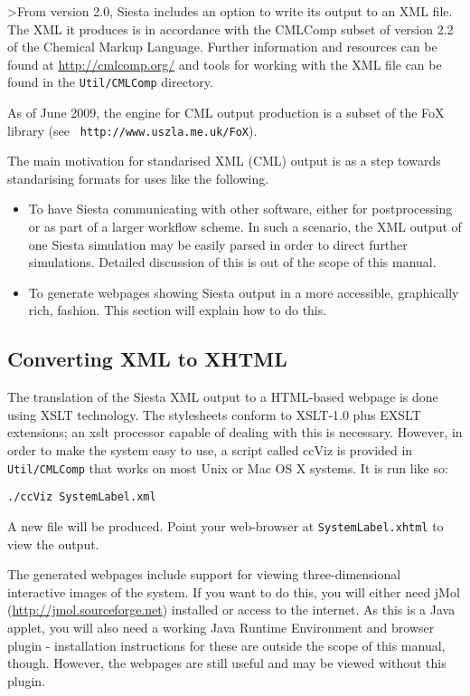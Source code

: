 \documentclass[11pt]{article}
\begin{document}
>From version 2.0, {\sc Siesta} includes an option to write its output to an
XML file. The XML it produces is in accordance with the CMLComp subset of
version 2.2 of the Chemical Markup Language. Further information
and resources can be found at \url{http://cmlcomp.org/} and tools for working
with the XML file can be found in the \texttt{Util/CMLComp} directory.

As of June 2009, the engine for CML output production is a subset of
the FoX library (see {\tt
  http://www.uszla.me.uk/FoX}).

The main motivation for standarised XML (CML) output is as a step
towards standarising formats for uses like the following.

\begin{itemize}

\item To have {\sc Siesta} communicating with other software, either
for postprocessing or as part of a larger workflow scheme. In such a
scenario, the XML output of one {\sc Siesta} simulation may be easily parsed
in order to direct further simulations. Detailed discussion of this is
out of the scope of this manual.

\item To generate webpages showing {\sc Siesta} output in a more accessible,
graphically rich, fashion. This section will explain how to do this.

\end{itemize}

\subsection{Converting XML to XHTML}

The translation of the {\sc Siesta} XML output to a HTML-based webpage is
done using XSLT technology. The stylesheets conform to XSLT-1.0 plus
EXSLT extensions; an xslt processor capable of dealing with this is
necessary. However, in order to make the system easy to use, a script
called ccViz is provided in \texttt{Util/CMLComp} that works on most Unix or
Mac OS X systems. It is run like so:

\texttt{./ccViz SystemLabel.xml}

A new file will be produced. Point your web-browser at \texttt{SystemLabel.xhtml}
to view the output.

The generated webpages include support for viewing three-dimensional
interactive images of the system. If you want to do this, you will
either need jMol (\url{http://jmol.sourceforge.net}) installed or access
to the internet. As this
is a Java applet, you will also need a working Java Runtime
Environment and browser plugin - installation instructions for these
are outside the scope of this manual, though. However, the webpages
are still useful and may be viewed without this plugin.
\end{document}
